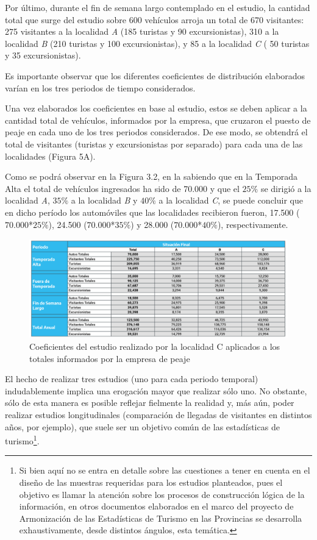 \documentclass[
]{book}
\begin{document}
Por último, durante el fin de semana largo contemplado en el estudio, la cantidad total que surge del estudio sobre 600 vehículos arroja un total de 670 visitantes: 275 visitantes a la localidad \emph{A} (185 turistas y 90 excursionistas), 310 a la localidad \emph{B} (210 turistas y 100 excursionistas), y 85 a la localidad \emph{C} ( 50 turistas y 35 excursionistas).

Es importante observar que los diferentes coeficientes de distribución elaborados varían en los tres periodos de tiempo considerados.

Una vez elaborados los coeficientes en base al estudio, estos se deben aplicar a la cantidad total de vehículos, informados por la empresa, que cruzaron el puesto de peaje en cada uno de los tres periodos considerados. De ese modo, se obtendrá el total de visitantes (turistas y excursionistas por separado) para cada una de las localidades (Figura 5A).

Como se podrá observar en la Figura 3.2, en la sabiendo que en la Temporada Alta el total de vehículos ingresados ha sido de 70.000 y que el \(25\%\) se dirigió a la localidad \emph{A}, \(35\%\) a la localidad \emph{B} y \(40\%\) a la localidad \emph{C}, se puede concluir que en dicho período los automóviles que las localidades recibieron fueron, 17.500 (\(70.000\)*\(25\%\)), 24.500 (\(70.000\)*\(35\%\)) y 28.000 (\(70.000\)*\(40\%\)), respectivamente.

\begin{figure}

{\centering \includegraphics[width=0.8\linewidth]{imagenes/figura5A} 

}

\caption{Coeficientes del estudio realizado por la localidad C aplicados a los totales informados por la empresa de peaje}\label{fig:coeficientes}
\end{figure}

El hecho de realizar tres estudios (uno para cada periodo temporal) indudablemente implica una erogación mayor que realizar sólo uno. No obstante, sólo de esta manera es posible reflejar fielmente la realidad y, más aún, poder realizar estudios longitudinales (comparación de llegadas de visitantes en distintos años, por ejemplo), que suele ser un objetivo común de las estadísticas de turismo\footnote{Si bien aquí no se entra en detalle sobre las cuestiones a tener en cuenta en el diseño de las muestras requeridas para los estudios planteados, pues el objetivo es llamar la atención sobre los procesos de construcción lógica de la información, en otros documentos elaborados en el marco del proyecto de Armonización de las Estadísticas de Turismo en las Provincias se desarrolla exhaustivamente, desde distintos ángulos, esta temática.}.
\end{document}
